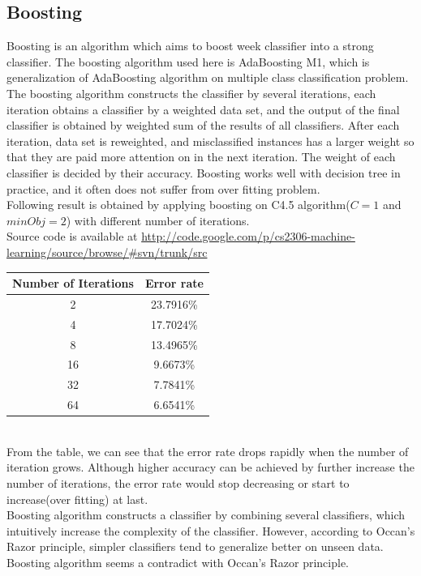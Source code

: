 \documentclass[a4paper,11pt]{article}
\begin{document}
\subsection{Boosting}
Boosting is an algorithm which aims to boost week classifier into a strong classifier. The boosting algorithm used here is AdaBoosting M1, which is
generalization of AdaBoosting algorithm on multiple class classification problem.\\
The boosting algorithm constructs the classifier by several iterations, each iteration obtains a classifier by a weighted data set, and the output of the final classifier is obtained by weighted sum of the results of all classifiers. After each iteration, data set is reweighted, and misclassified instances has a larger weight so that they are paid more attention on in the next iteration. The weight of each classifier is decided by their accuracy. Boosting works well with decision tree in practice, and it often does not suffer from over fitting problem.\\
Following result is obtained by applying boosting on C4.5 algorithm($C=1$ and $minObj=2$) with different number of iterations.\\
Source code is available at \url{http://code.google.com/p/cs2306-machine-learning/source/browse/#svn/trunk/src}\\
\vspace{0.5cm}
\begin{tabular}{c c}
Number of Iterations	& Error rate\\
\hline \hline
	2		& 23.7916\%\\
	4		& 17.7024\%\\
	8		& 13.4965\%\\
	16		& 9.6673\%\\
    32      & 7.7841\%\\
    64      & 6.6541\%\\
\end{tabular}
\vspace{0.5cm}\\
From the table, we can see that the error rate drops rapidly when the number of iteration grows. Although higher accuracy can be achieved by further increase the number of iterations, the error rate would stop decreasing or start to increase(over fitting) at last.\\
Boosting algorithm constructs a classifier by combining several classifiers, which intuitively increase the complexity of the classifier. However, according to Occan's Razor principle, simpler classifiers tend to generalize better on unseen data. Boosting algorithm seems a contradict with Occan's Razor principle.\\
\end{document}
